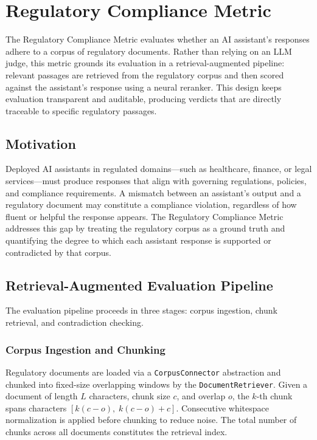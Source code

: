 \section{Regulatory Compliance Metric}

The Regulatory Compliance Metric evaluates whether an AI assistant's responses adhere to a corpus of regulatory documents. Rather than relying on an LLM judge, this metric grounds its evaluation in a retrieval-augmented pipeline: relevant passages are retrieved from the regulatory corpus and then scored against the assistant's response using a neural reranker. This design keeps evaluation transparent and auditable, producing verdicts that are directly traceable to specific regulatory passages.

\subsection{Motivation}

Deployed AI assistants in regulated domains---such as healthcare, finance, or legal services---must produce responses that align with governing regulations, policies, and compliance requirements. A mismatch between an assistant's output and a regulatory document may constitute a compliance violation, regardless of how fluent or helpful the response appears. The Regulatory Compliance Metric addresses this gap by treating the regulatory corpus as a ground truth and quantifying the degree to which each assistant response is supported or contradicted by that corpus.

\subsection{Retrieval-Augmented Evaluation Pipeline}

The evaluation pipeline proceeds in three stages: corpus ingestion, chunk retrieval, and contradiction checking.

\subsubsection{Corpus Ingestion and Chunking}

Regulatory documents are loaded via a \texttt{CorpusConnector} abstraction and chunked into fixed-size overlapping windows by the \texttt{DocumentRetriever}. Given a document of length $L$ characters, chunk size $c$, and overlap $o$, the $k$-th chunk spans characters $[k(c - o),\; k(c - o) + c]$. Consecutive whitespace normalization is applied before chunking to reduce noise. The total number of chunks across all documents constitutes the retrieval index.


